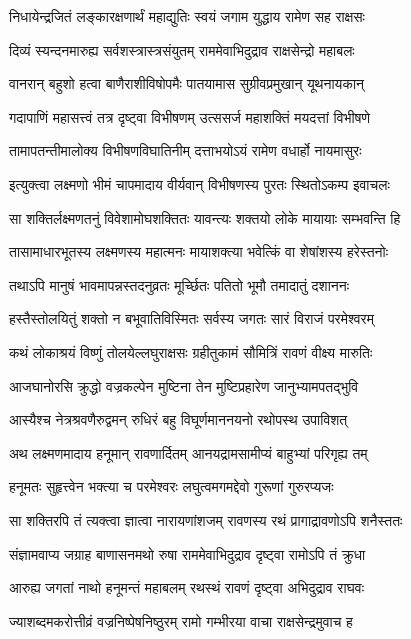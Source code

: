\twolineshloka
{निधायेन्द्रजितं लङ्कारक्षणार्थं महाद्युतिः}
{स्वयं जगाम युद्धाय रामेण सह राक्षसः} %

\twolineshloka
{दिव्यं स्यन्दनमारुह्य सर्वशस्त्रास्त्रसंयुतम्}
{राममेवाभिदुद्राव राक्षसेन्द्रो महाबलः} %

\twolineshloka
{वानरान् बहुशो हत्वा बाणैराशीविषोपमैः}
{पातयामास सुग्रीवप्रमुखान् यूथनायकान्} %

\twolineshloka
{गदापाणिं महासत्त्वं तत्र दृष्ट्वा विभीषणम्}
{उत्ससर्ज महाशक्तिं मयदत्तां विभीषणे} %

\twolineshloka
{तामापतन्तीमालोक्य विभीषणविघातिनीम्}
{दत्ताभयोऽयं रामेण वधार्हो नायमासुरः} %

\twolineshloka
{इत्युक्त्वा लक्ष्मणो भीमं चापमादाय वीर्यवान्}
{विभीषणस्य पुरतः स्थितोऽकम्प इवाचलः} %

\twolineshloka
{सा शक्तिर्लक्ष्मणतनुं विवेशामोघशक्तितः}
{यावन्त्यः शक्तयो लोके मायायाः सम्भवन्ति हि} %

\twolineshloka
{तासामाधारभूतस्य लक्ष्मणस्य महात्मनः}
{मायाशक्त्या भवेत्किं वा शेषांशस्य हरेस्तनोः} %

\twolineshloka
{तथाऽपि मानुषं भावमापन्नस्तदनुव्रतः}
{मूर्च्छितः पतितो भूमौ तमादातुं दशाननः} %

\twolineshloka
{हस्तैस्तोलयितुं शक्तो न बभूवातिविस्मितः}
{सर्वस्य जगतः सारं विराजं परमेश्वरम्} %

\twolineshloka
{कथं लोकाश्रयं विष्णुं तोलयेल्लघुराक्षसः}
{ग्रहीतुकामं सौमित्रिं रावणं वीक्ष्य मारुतिः} %

\twolineshloka
{आजघानोरसि क्रुद्धो वज्रकल्पेन मुष्टिना}
{तेन मुष्टिप्रहारेण जानुभ्यामपतद्भुवि} %

\twolineshloka
{आस्यैश्च नेत्रश्रवणैरुद्वमन् रुधिरं बहु}
{विघूर्णमाननयनो रथोपस्थ उपाविशत्} %

\twolineshloka
{अथ लक्ष्मणमादाय हनूमान् रावणार्दितम्}
{आनयद्रामसामीप्यं बाहुभ्यां परिगृह्य तम्} %

\twolineshloka
{हनूमतः सुहृत्त्वेन भक्त्या च परमेश्वरः}
{लघुत्वमगमद्देवो गुरूणां गुरुरप्यजः} %

\twolineshloka
{सा शक्तिरपि तं त्यक्त्वा ज्ञात्वा नारायणांशजम्}
{रावणस्य रथं प्रागाद्रावणोऽपि शनैस्ततः} %

\twolineshloka
{संज्ञामवाप्य जग्राह बाणासनमथो रुषा}
{राममेवाभिदुद्राव दृष्ट्वा रामोऽपि तं क्रुधा} %

\twolineshloka
{आरुह्य जगतां नाथो हनूमन्तं महाबलम्}
{रथस्थं रावणं दृष्ट्वा अभिदुद्राव राघवः} %

\twolineshloka
{ज्याशब्दमकरोत्तीव्रं वज्रनिष्पेषनिष्ठुरम्}
{रामो गम्भीरया वाचा राक्षसेन्द्रमुवाच ह} %

